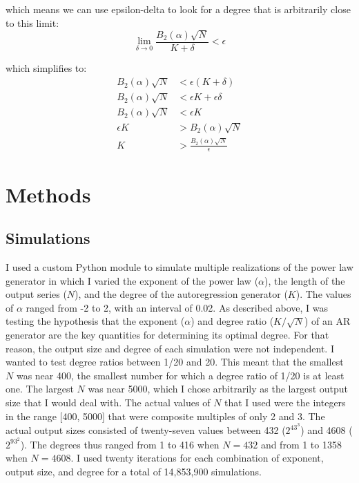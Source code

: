 \documentclass[preprint]{JASA}
\begin{document}
which means we can use epsilon-delta to look for a degree that is arbitrarily
close to this limit:
\begin{equation}
  \lim_{\delta \to 0}{\frac{B_2(\alpha)\sqrt{N}}{K+\delta}} < \epsilon
\end{equation}

which simplifies to:
\begin{align}
  B_2(\alpha)\sqrt{N} & < \epsilon({K + \delta}) \\
  B_2(\alpha)\sqrt{N} & < \epsilon K + \epsilon\delta \\
  B_2(\alpha)\sqrt{N} & < \epsilon K \\
  \epsilon K & > B_2(\alpha)\sqrt{N} \\
  K &> \frac{B_2(\alpha)\sqrt{N}}{\epsilon}
\end{align}

\section{Methods}

\subsection{Simulations}

I used a custom Python module to simulate multiple realizations of the power law generator in which I varied the exponent of the power law ($\alpha$), the length of the output series ($N$), and the degree of the autoregression generator ($K$).
The values of $\alpha$ ranged from -2 to 2, with an interval of 0.02.
As described above, I was testing the hypothesis that the exponent ($\alpha$) and  degree ratio ($K/\sqrt{N}$) of an AR generator are the key quantities for determining its optimal degree.
For that reason, the output size and degree of each simulation were not independent.
I wanted to test degree ratios between 1/20 and 20.
This meant that the smallest $N$ was near 400, the smallest number for which a degree ratio of 1/20 is at least one.
The largest $N$ was near 5000, which I chose arbitrarily as the largest output size that I would deal with.
The actual values of $N$ that I used were the integers in the range [400, 5000] that were composite multiples of only 2 and 3.
The actual output sizes consisted of twenty-seven values between 432 ($2^43^3$) and 4608 ($2^93^2$).
The degrees thus ranged from 1 to 416 when $N=432$ and from 1 to 1358 when $N=4608$. 
I used twenty iterations for each combination of exponent, output size, and degree for a total of 14,853,900 simulations.
\end{document}
